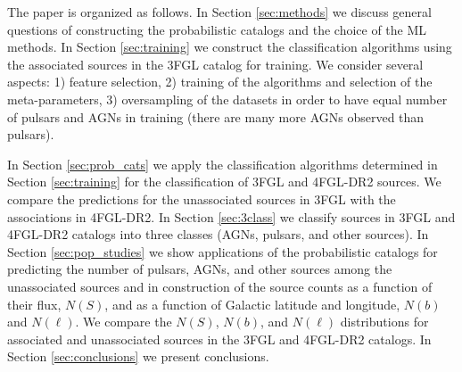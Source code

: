 The paper is organized as follows.
In Section \ref{sec:methods} we discuss general questions of constructing the probabilistic catalogs and the choice of the ML methods.
In Section \ref{sec:training} we construct the classification algorithms using the associated sources in the 3FGL catalog for training. We consider several aspects: 1) feature selection, 2) training of the algorithms and selection of the meta-parameters,
3) oversampling of the datasets in order to have equal number of pulsars and AGNs in training (there are many more AGNs observed than pulsars).

In Section \ref{sec:prob_cats} we apply the classification algorithms determined in Section \ref{sec:training} for the classification of 3FGL and 4FGL-DR2 sources.
We compare the predictions for the unassociated sources in 3FGL with the associations in 4FGL-DR2.
In Section \ref{sec:3class} we classify sources in 3FGL and 4FGL-DR2 catalogs into three classes (AGNs, pulsars, and other sources).
In Section \ref{sec:pop_studies} we show applications of the probabilistic catalogs for predicting the number of pulsars, AGNs, and other sources among the unassociated sources and in construction of the source counts as a function of their flux, $N(S)$, and as a function of 
Galactic latitude and longitude, $N(b)$ and $N(\ell)$.
We compare the $N(S)$, $N(b)$, and $N(\ell)$ distributions for associated and unassociated sources in the 3FGL and 4FGL-DR2 catalogs.
In Section \ref{sec:conclusions} we present conclusions.



